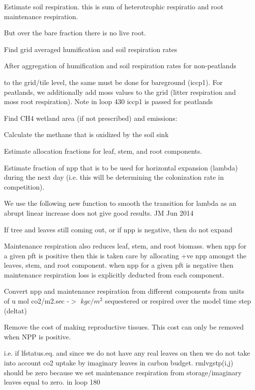 Estimate soil respiration. this is sum of heterotrophic respiratio and root maintenance respiration.

But over the bare fraction there is no live root.

Find grid averaged humification and soil respiration rates \begin{DoxyVerb}After aggregation of humification and soil respiration rates for non-peatlands
\end{DoxyVerb}
 to the grid/tile level, the same must be done for bareground (iccp1). For peatlands, we additionally add moss values to the grid (litter respiration and moss root respiration). Note in loop 430 iccp1 is passed for peatlands

Find C\+H4 wetland area (if not prescribed) and emissions\+:

Calculate the methane that is oxidized by the soil sink

Estimate allocation fractions for leaf, stem, and root components.

Estimate fraction of npp that is to be used for horizontal expansion (lambda) during the next day (i.\+e. this will be determining the colonization rate in competition).

We use the following new function to smooth the transition for lambda as an abrupt linear increase does not give good results. J\+M Jun 2014

If tree and leaves still coming out, or if npp is negative, then do not expand

Maintenance respiration also reduces leaf, stem, and root biomass. when npp for a given pft is positive then this is taken care by allocating +ve npp amongst the leaves, stem, and root component. when npp for a given pft is negative then maintenance respiration loss is explicitly deducted from each component.

Convert npp and maintenance respiration from different components from units of u mol co2/m2.\+sec -\/$>$ $kg c/m^2$ sequestered or respired over the model time step (deltat)

Remove the cost of making reproductive tissues. This cost can only be removed when N\+P\+P is positive.

i.\+e. if lfstatus.\+eq. and since we do not have any real leaves on then we do not take into account co2 uptake by imaginary leaves in carbon budget. rmlvgstp(i,j) should be zero because we set maintenance respiration from storage/imaginary leaves equal to zero. in loop 180

